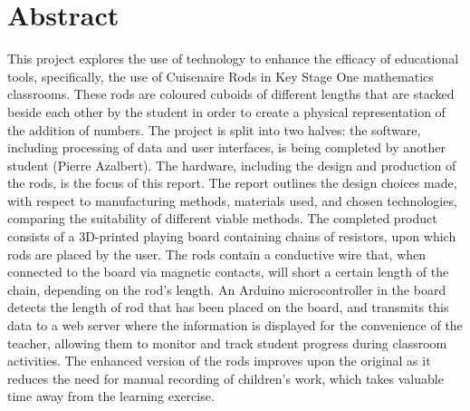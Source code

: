 \section*{Abstract}

This project explores the use of technology to enhance the efficacy of educational tools, specifically, the use of Cuisenaire\textsuperscript{\textregistered} Rods in Key Stage One mathematics classrooms. These rods are coloured cuboids of different lengths that are stacked beside each other by the student in order to create a physical representation of the addition of numbers. The project is split into two halves: the software, including processing of data and user interfaces, is being completed by another student (Pierre Azalbert). The hardware, including the design and production of the rods, is the focus of this report. The report outlines the design choices made, with respect to manufacturing methods, materials used, and chosen technologies, comparing the suitability of different viable methods. The completed product consists of a 3D-printed playing board containing chains of resistors, upon which rods are placed by the user. The rods contain a conductive wire that, when connected to the board via magnetic contacts, will short a certain length of the chain, depending on the rod's length. An Arduino microcontroller in the board detects the length of rod that has been placed on the board, and transmits this data to a web server where the information is displayed for the convenience of the teacher, allowing them to monitor and track student progress during classroom activities. The enhanced version of the rods improves upon the original as it reduces the need for manual recording of children’s work, which takes valuable time away from the learning exercise.
